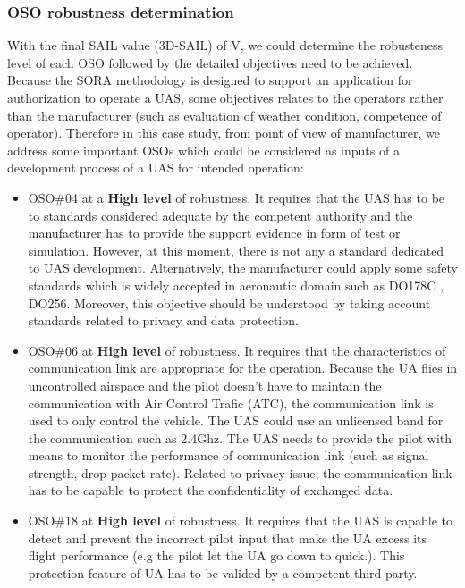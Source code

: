 \documentclass[a4paper, 10, conference]{ieeeconf}  %
\begin{document}
\subsubsection{OSO robustness determination} With the final SAIL value (3D-SAIL) of V, we could determine the robusteness level of each OSO followed by the detailed objectives need to be achieved. Because the SORA methodology is designed to support an application for authorization to operate a UAS, some objectives relates to the operators rather than the manufacturer (such as evaluation of weather condition, competence of operator). Therefore in this case study, from point of view of manufacturer, we address some important OSOs which could be considered as inputs of a development process of a UAS for intended operation:
\begin{itemize}
	\item OSO\#04 at a \textbf{High level} of robustness. It requires that the UAS has to be to standards considered adequate by the competent authority and the manufacturer has to provide the support evidence in form of test or simulation. However, at this moment, there is not any a standard dedicated to UAS development. Alternatively, the manufacturer could apply some safety standards which is widely accepted in aeronautic domain such as DO178C , DO256. Moreover, this objective should be understood by taking account standards related to privacy and data protection.
	
	\item OSO\#06 at \textbf{High level} of robustness. It requires that the characteristics of communication link are appropriate for the operation. Because the UA flies in uncontrolled airspace and the pilot doesn't have to maintain the communication with Air Control Trafic (ATC), the communication link is used to only control the vehicle. The UAS could use an unlicensed band for the communication such as 2.4Ghz. The UAS needs to provide the pilot with means to monitor the performance of communication link (such as signal strength, drop packet rate). Related to privacy issue, the communication link has to be capable to protect the confidentiality of exchanged data.
	
	
	\item OSO\#18 at \textbf{High level} of robustness. It requires that the UAS is capable to detect and prevent the incorrect pilot input that make the UA excess its flight performance (e.g the pilot let the UA go down to quick.). This protection feature of UA has to be valided by a competent third party. 
	
	
\end{itemize}
\end{document}
